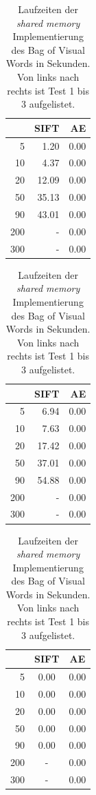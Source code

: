 \begin{table}
    \hfill
    \begin{tabular}[t]{| r | r | r |}
    \hline
	     & SIFT & AE \\ \hline    
    5    &  1.20 & 0.00 \\ \hline
    10   &  4.37 & 0.00 \\ \hline
    20   & 12.09 & 0.00 \\ \hline
    50   & 35.13 & 0.00 \\ \hline
    90   & 43.01 & 0.00 \\ \hline
	200  & -     & 0.00 \\ \hline
	300  & -     & 0.00 \\ \hline    
    \end{tabular}
    \hfill
    \begin{tabular}[t]{| r | r | r |}
    \hline
	     & SIFT & AE \\ \hline    
    5    &   6.94 & 0.00 \\ \hline
    10   &   7.63 & 0.00 \\ \hline
    20   &  17.42 & 0.00 \\ \hline
    50   &  37.01 & 0.00 \\ \hline
    90   &  54.88 & 0.00 \\ \hline
	200  &      - & 0.00 \\ \hline
	300  & 	    - & 0.00 \\ \hline
	\end{tabular}
    \hfill
    \begin{tabular}[t]{| r | c | c |}
    \hline
	     & SIFT & AE \\ \hline    
    5    & 0.00 & 0.00 \\ \hline
    10   & 0.00 & 0.00 \\ \hline
    20   & 0.00 & 0.00 \\ \hline
    50   & 0.00 & 0.00 \\ \hline
    90   & 0.00 & 0.00 \\ \hline
	200  & -    & 0.00 \\ \hline
	300  & -    & 0.00 \\ \hline
	\end{tabular}
    \hfill
	\caption{Laufzeiten der \textit{shared memory} Implementierung des Bag of Visual Words in Sekunden. Von links nach rechts ist Test 1 bis 3 aufgelistet.}
\end{table}